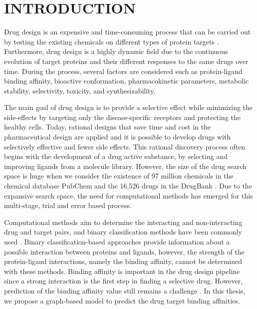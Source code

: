 \chapter{INTRODUCTION}
\label{chapter:introduction}
Drug design is an expensive and time-consuming process that can be carried out by testing the existing chemicals on different types of protein targets \cite{csermely2013structure}. Furthermore, drug design is a highly dynamic field due to the continuous evolution of target proteins and their different responses to the same drugs over time. During the process, several factors are considered such as protein-ligand binding affinity, bioactive conformation, pharmacokinetic parameters, metabolic stability, selectivity, toxicity, and synthesizability.

The main goal of drug design is to provide a selective effect while minimizing the side-effects by targeting only the disease-specific receptors and protecting the healthy cells. Today, rational designs that save time and cost in the pharmaceutical design are applied and it is possible to develop drugs with selectively effective and fewer side effects. This rational discovery process often begins with the development of a drug active substance, by selecting and improving ligands from a molecule library. However, the size of the drug search space is huge when we consider the existence of 97 million chemicals in the chemical database PubChem \cite{bolton2008pubchem} and the 16,526 drugs in the DrugBank \cite{law2013drugbank}. Due to the expansive search space, the need for computational methods has emerged for this multi-stage, trial and error based process. 

Computational methods aim to determine the interacting and non-interacting drug and target pairs, and binary classification methods have been commonly used \cite{yamanishi2010drug, liu2016neighborhood, nascimento2016multiple, keum2017self, greenside2017prediction}. Binary classification-based approaches provide information about a possible interaction between proteins and ligands, however, the strength of the protein-ligand interactions, namely the binding affinity, cannot be determined with these methods. Binding affinity is important  in the drug design pipeline since a strong interaction is the first step in finding a selective drug. However, prediction of the binding affinity value still remains a challenge \cite{ozturk2018deepdta}. In this thesis, we propose a graph-based model to predict the drug target binding affinities.

